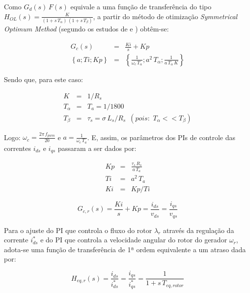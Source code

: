 Como $ G_{d}(s)\,F(s) $ equivale a uma função de transferência do tipo $ H_{OL}(s) = \frac{K}{(1 + s\,T_\alpha)\,(1 + s\,T_\beta)} $, a partir do método de otimização \textit{Symmetrical Optimum Method} (segundo os estudos de  e  ) obtêm-se:

\begin{eqnarray}
  G_c(s) &=& \frac{Ki}{s} + Kp
 \\
  \left \{ a; Ti; Kp \right \} &=& \left \{\frac{1}{\omega_c\,T_\alpha}; a^2\,T_\alpha; \frac{1}{a\,T_\alpha\,K} \right \}
\end{eqnarray}

Sendo que, para este caso:

\begin{eqnarray}
  K &=& 1/R_s
  \\
  T_\alpha &=& T_a = 1/1800
  \\
  T_\beta &=& \tau_s = \sigma\,L_s/R_s  \,\,\,(pois:\,\,T_\alpha << T_\beta)
\end{eqnarray}

Logo: $\omega_c = \frac{2\pi\,f_{pwm}}{20}$ e $a = \frac{1}{\omega_c\,T_a}$.
E, assim, os parâmetros dos PIs de controle das correntes $i_{ds}$ e $i_{qs}$ passaram a ser dados por:

\begin{eqnarray}
  Kp &=& \frac{\tau_s\,R_s}{a\,T_a}
  \\
  Ti &=& a^2\,T_a
  \\
  Ki &=& Kp/Ti
\end{eqnarray}

\begin{equation}
\label{eq:PI_Corr_Gerador}
  G_{c,r}(s) = \frac{Ki}{s} + Kp = \frac{i_{ds}}{v_{ds}} = \frac{i_{qs}}{v_{qs}}
\end{equation}


Para o ajuste do PI que controla o fluxo do rotor $\lambda_{r}$ através da regulação da corrente $i_{ds}^*$ e do PI que controla a velocidade angular do rotor do gerador $\omega_r$, adota-se uma função de transferência de 1ª ordem equivalente a um atraso dada por:

\begin{equation}
\label{eq:funcao_cor_corref_ger}
  H_{eq,r}(s) = \frac{i_{ds}}{i_{ds}^*} = \frac{i_{qs}}{i_{qs}^*} = \frac{1}{1 + s\,T_{eq,rotor}}
\end{equation}

